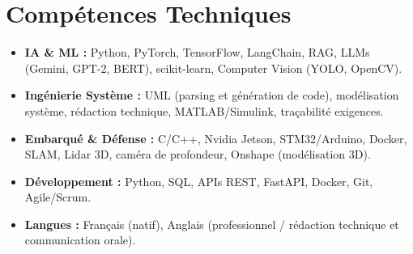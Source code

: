 \documentclass[a4paper,11pt]{article}
\begin{document}
\section{Compétences Techniques}
\begin{itemize}[leftmargin=*, nosep]
    \item \small{\textbf{IA \& ML :} Python, PyTorch, TensorFlow, LangChain, RAG, LLMs (Gemini, GPT-2, BERT), scikit-learn, Computer Vision (YOLO, OpenCV).}
    \item \small{\textbf{Ingénierie Système :} UML (parsing et génération de code), modélisation système, rédaction technique, MATLAB/Simulink, traçabilité exigences.}
    \item \small{\textbf{Embarqué \& Défense :} C/C++, Nvidia Jetson, STM32/Arduino, Docker, SLAM, Lidar 3D, caméra de profondeur, Onshape (modélisation 3D).}
    \item \small{\textbf{Développement :} Python, SQL, APIs REST, FastAPI, Docker, Git, Agile/Scrum.}
    \item \small{\textbf{Langues :} Français (natif), Anglais (professionnel / rédaction technique et communication orale).}
\end{itemize}

\end{document}
